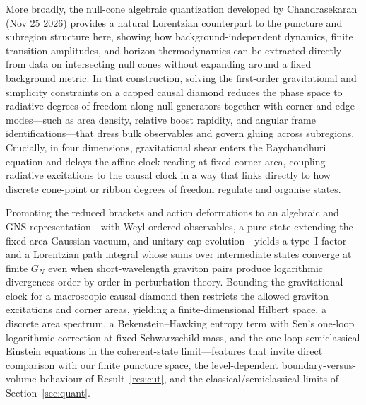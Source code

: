 \documentclass[11pt]{article}
\theoremstyle{definition}
\begin{document}
More broadly, the null-cone algebraic quantization developed by Chandrasekaran (Nov 25 2026)
\cite{chandrasekaran2026} provides a natural Lorentzian counterpart to the puncture and subregion structure here, showing how background-independent dynamics, finite transition amplitudes, and horizon thermodynamics can be extracted directly from data on intersecting null cones without expanding around a fixed background metric. In that construction, solving the first-order gravitational and simplicity constraints on a capped causal diamond reduces the phase space to radiative degrees of freedom along null generators together with corner and edge modes---such as area density, relative boost rapidity, and angular frame identifications---that dress bulk observables and govern gluing across subregions. Crucially, in four dimensions, gravitational shear enters the Raychaudhuri equation and delays the affine clock reading at fixed corner area, coupling radiative excitations to the causal clock in a way that links directly to how discrete cone-point or ribbon degrees of freedom regulate and organise states.

Promoting the reduced brackets and action deformations to an algebraic and GNS representation---with Weyl-ordered observables, a pure state extending the fixed-area Gaussian vacuum, and unitary cap evolution---yields a type~I factor and a Lorentzian path integral whose sums over intermediate states converge at finite $G_N$ even when short-wavelength graviton pairs produce logarithmic divergences order by order in perturbation theory. Bounding the gravitational clock for a macroscopic causal diamond then restricts the allowed graviton excitations and corner areas, yielding a finite-dimensional Hilbert space, a discrete area spectrum, a Bekenstein--Hawking entropy term with Sen's one-loop logarithmic correction at fixed Schwarzschild mass, and the one-loop semiclassical Einstein equations in the coherent-state limit---features that invite direct comparison with our finite puncture space, the level-dependent boundary-versus-volume behaviour of Result~\ref{res:cut}, and the classical/semiclassical limits of Section~\ref{sec:quant}.

\end{document}
